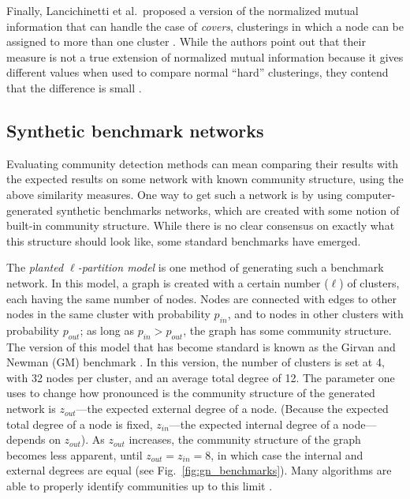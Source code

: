 Finally, Lancichinetti et al.~proposed a version of the normalized
mutual information that can handle the case of \emph{covers},
clusterings in which a node can be assigned to more than one cluster
\autocite{lancichinetti_detecting_2009}. While the authors point out
that their measure is not a true extension of normalized mutual
information because it gives different values when used to compare
normal ``hard'' clusterings, they contend that the difference is small
\autocite{lancichinetti_community_2009}.

\hypertarget{synthetic-benchmark-networks}{\subsection{Synthetic
benchmark networks}\label{synthetic-benchmark-networks}}

Evaluating community detection methods can mean comparing their results
with the expected results on some network with known community
structure, using the above similarity measures. One way to get such a
network is by using computer-generated synthetic benchmarks networks,
which are created with some notion of built-in community structure.
While there is no clear consensus on exactly what this structure should
look like, some standard benchmarks have emerged.

The \emph{planted \(\ell\)-partition model} is one method of generating
such a benchmark network. In this model, a graph is created with a
certain number (\(\ell\)) of clusters, each having the same number of
nodes. Nodes are connected with edges to other nodes in the same cluster
with probability \(p_{in}\), and to nodes in other clusters with
probability \(p_{out}\); as long as \(p_{in} > p_{out}\), the graph has
some community structure. The version of this model that has become
standard is known as the Girvan and Newman (GM) benchmark
\autocite{girvan_community_2002}. In this version, the number of
clusters is set at 4, with 32 nodes per cluster, and an average total
degree of 12. The parameter one uses to change how pronounced is the
community structure of the generated network is \(z_{out}\)---the
expected external degree of a node. (Because the expected total degree
of a node is fixed, \(z_{in}\)---the expected internal degree of a
node---depends on \(z_{out}\)). As \(z_{out}\) increases, the community
structure of the graph becomes less apparent, until
\(z_{out} = z_{in} = 8\), in which case the internal and external
degrees are equal (see Fig.~\ref{fig:gn_benchmarks}). Many algorithms
are able to properly identify communities up to this limit
\autocite{fortunato_community_2010}.

